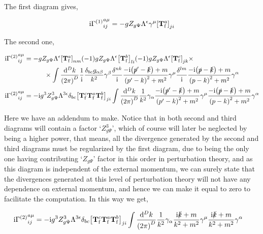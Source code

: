 The first diagram gives,

\begin{align}
    \textnormal{i}{\Gamma^{\qty(1)}}^{a\mu}_{ij}=-gZ_{g\Psi}\Lambda^\epsilon\gamma^\mu\qty[\vb T^a_{\textnormal{f}}]_{ji}\nonumber
\end{align}

The second one,

\begin{align}
    \textnormal{i}{\Gamma^{\qty(2)}}^{a\mu}_{ij}&=-gZ_{g\Psi}\Lambda^\epsilon\qty[{\vb T^a_{\textnormal{f}}}]_{nm}
    \qty(-1)gZ_{g\Psi}\Lambda^\epsilon\qty[{\vb T^b_{\textnormal{f}}}]_{li}
    \qty(-1)gZ_{g\Psi}\Lambda^\epsilon\qty[{\vb T^c_{\textnormal{f}}}]_{jk}\times\nonumber\\
    &\quad\quad\quad\times\int\frac{\dd[D]{k}}{\qty(2\pi)^D}\frac1{\textnormal{i}}\frac{\delta_{bc}g_{\alpha\beta}}{k^2}
    \gamma^\beta\frac{\delta^{nk}}{\textnormal{i}}\frac{-\textnormal{i}\qty(\slashed p'-\slashed k)+m}{\qty({p'}-k)^2+m^2}
    \gamma^\mu\frac{\delta^{lm}}{\textnormal{i}}\frac{-\textnormal{i}\qty(\slashed p-\slashed k)+m}{\qty(p-k)^2+m^2}
    \gamma^\alpha\nonumber\\
    \textnormal{i}{\Gamma^{\qty(2)}}^{a\mu}_{ij}&=-\textnormal{i} g^3Z_{g\Psi}^3\Lambda^{3\epsilon}\delta_{bc}
    \qty[{\vb T^c_{\textnormal{f}}}{\vb T^a_{\textnormal{f}}}{\vb T^b_{\textnormal{f}}}]_{ji}
    \int\frac{\dd[D]{k}}{\qty(2\pi)^D}\frac{1}{k^2}
    \gamma_\alpha\frac{-\textnormal{i}\qty(\slashed p'-\slashed k)+m}{\qty({p'}-k)^2+m^2}
    \gamma^\mu\frac{-\textnormal{i}\qty(\slashed p-\slashed k)+m}{\qty(p-k)^2+m^2}
    \gamma^\alpha\nonumber
\end{align}

Here we have an addendum to make. Notice that in both second and third diagrams will contain a factor 
`$Z_{g\Psi}^3$', which of course will later be neglected by being a higher power, that means, all the divergence 
generated by the second and third diagrams must be regularized by the first diagram, due to being the only one 
having contributing `$Z_{g\Psi}$' factor in this order in perturbation theory, and as this diagram is independent 
of the external momentum, we can surely state that the divergences generated at this level of perturbation 
theory will not have any dependence on external momentum, and hence we can make it equal to zero to facilitate 
the computation. In this way we get,

\begin{align}
    \textnormal{i}{\Gamma^{\qty(2)}}^{a\mu}_{ij}&=-\textnormal{i} g^3Z_{g\Psi}^3\Lambda^{3\epsilon}\delta_{bc}
    \qty[{\vb T^c_{\textnormal{f}}}{\vb T^a_{\textnormal{f}}}{\vb T^b_{\textnormal{f}}}]_{ji}
    \int\frac{\dd[D]{k}}{\qty(2\pi)^D}\frac{1}{k^2}
    \gamma_\alpha\frac{\textnormal{i}\slashed k+m}{k^2+m^2}
    \gamma^\mu\frac{\textnormal{i}\slashed k+m}{k^2+m^2}
    \gamma^\alpha\nonumber
\end{align}


